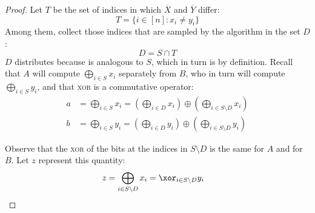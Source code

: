 \begin{proof}
    Let $T$ be the set of indices in which $\overline{X}$ and $\overline{Y}$ differ:
    \[
        T = \{ i \in [n]: x_i \neq y_i\} 
    \]
    Among them, collect those indices that are sampled by the algorithm in the set $D$:
    \[
        D = S \cap T 
    \]
    $D$ distributes \uar{} because is analogous to $S$, which in turn is \uar{} by definition. Recall that $A$ will compute $\bigoplus_{i \in S} x_i$ separately from $B$, who in turn will compute $\bigoplus_{i \in S} y_i$, and that \textsc{xor} is a commutative operator:
    \begin{align*}
        a &= \bigoplus_{i \in S} x_i = \left( \bigoplus_{i \in D} x_i \right) \oplus \left( \bigoplus_{i \in S \setminus D} x_i \right) \\
        b &= \bigoplus_{i \in S} y_i = \left( \bigoplus_{i \in D} y_i \right) \oplus \left( \bigoplus_{i \in S \setminus D} y_i \right)
    \end{align*}

    Observe that the \textsc{xor} of the bits at the indices in $S \setminus D$ is the same for $A$ and for $B$. Let $z$ represent this quantity:
    \begin{align*}        
        z = \bigoplus_{i \in S \setminus D} x_i &= \xor_{i \in S \setminus D} y_i
    \end{align*}


\end{proof}
